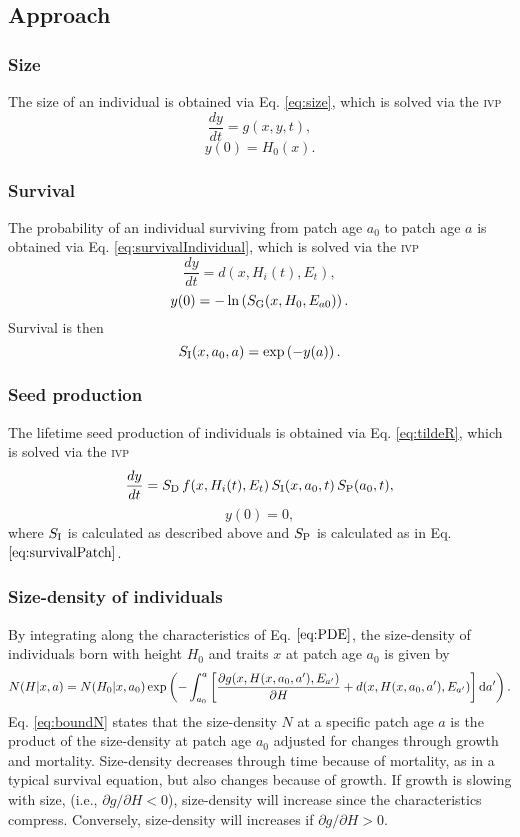 \documentclass[10pt,twoside]{article}
\begin{document}
\subsection{Approach}\label{approach}

\subsubsection{Size}\label{size}

The size of an individual is obtained via Eq.
\ref{eq:size}, which is solved via the \textsc{ivp}
\[\frac{dy}{dt} = g(x, y, t) ,\] \[ y(0) = H_0(x).\]

\subsubsection{Survival}\label{survival}

The probability of an individual surviving from patch age
\(a_0\) to patch age \(a\) is obtained via Eq. \ref{eq:survivalIndividual},
which is solved via the \textsc{ivp}
\[\frac{dy}{dt} = d(x, H_i(t) , E_t),\]
\[ y(0) = - \ln\left(S_{\rm G} (x, H_0, E_{a0})\right) .\]
Survival is then \[ S_{\rm I} (x, a_0, a) = \exp\left( - y(a) \right).\]

\subsubsection{Seed production}\label{seed-production}

The lifetime seed production of individuals is
obtained via Eq. \ref{eq:tildeR}, which is solved via the \textsc{ivp}
\[\frac{dy}{dt} = S_{\rm D} \, f(x, H_i(t), E_t) \, S_{\rm I} (x, a_0,t) \, S_{\rm P} (a_0, t),\]
\[ y(0) = 0,\] where \(S_{\rm I}\) is calculated as described
above and \(S_{\rm P}\) is calculated as in Eq.
\(\ref{eq:survivalPatch}\).

\subsubsection{Size-density of individuals}\label{density-of-individuals}

By integrating along the characteristics of Eq. \(\ref{eq:PDE}\),
the size-density of individuals born with height \(H_0\) and traits \(x\) at patch age \(a_{0}\) is given by
\citep{Deroos-1997,Angulo-2004}
\begin{equation}\label{eq:boundN}
N(H | x, a) = N(H_0 | x, a_0)
\exp \left( - \int _{a_0}^{a} \left[\frac{\partial g(x, H(x, a_0, a^\prime), E_{a^\prime})}{\partial H} + d(x, H(x, a_0, a^\prime), E_{a^\prime})\right] {\rm d} a^\prime \right).
\end{equation}
Eq. \ref{eq:boundN} states that the size-density \(N\) at a specific patch age \(a\) is
the product of the size-density at patch age \(a_{0}\) adjusted for changes through
growth and mortality. Size-density decreases through time because of
mortality, as in a typical survival equation, but also changes
because of growth. If growth is slowing with size, (i.e.,
\(\partial g / \partial H < 0\)), size-density will increase since the
characteristics compress. Conversely, size-density will increases if
\(\partial g / \partial H > 0\).
\end{document}
